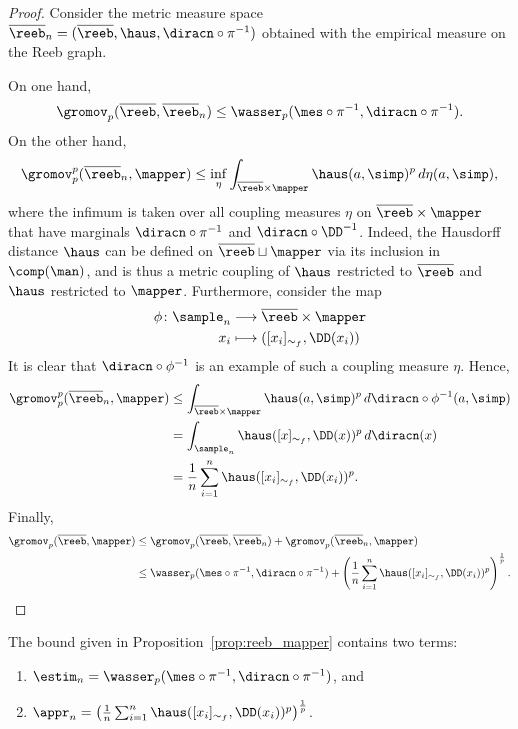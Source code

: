  \begin{proof}
 Consider the metric measure space $\overline{\reeb}_n=(\overline{\reeb},\haus,\diracn\circ\pi^{-1})$ obtained with the empirical measure on the Reeb graph.
 
 On one hand,
$$\gromov_p(\overline{\reeb},\overline{\reeb}_n)\leq\wasser_p(\mes\circ\pi^{-1},\diracn\circ\pi^{-1}).$$
%
On the other hand, 
%
$$\gromov_p^p(\overline{\reeb}_n,\mapper)\leq \inf_{\eta}\int_{\overline{\reeb}\times\mapper}\haus(a,\simp)^p\,d\eta(a,\simp),$$
%
 where the infimum is taken over all coupling measures $\eta$ on $\overline{\reeb}\times\mapper$ that have marginals $\diracn\circ\pi^{-1}$ and $\diracn\circ\DD^{-1}$. Indeed, the Hausdorff distance $\haus$ can be defined on $\overline{\reeb}\sqcup\mapper$ via its inclusion in $\comp(\man)$, and is thus a metric coupling of $\haus$ restricted to $\overline{\reeb}$ and $\haus$ restricted to $\mapper$. Furthermore, consider the map
 \begin{align*}
     \phi\colon\sample_n&\longrightarrow\overline{\reeb}\times\mapper\\
     x_i&\longmapsto([x_i]_{\sim_f},\DD(x_i))
 \end{align*}
 It is clear that $\diracn\circ\phi^{-1}$ is an example of such a coupling measure $\eta$. Hence,
 \begin{align*}
    \gromov_p^p(\overline{\reeb}_n,\mapper)&\leq \int_{\overline{\reeb}\times\mapper}\haus(a,\simp)^p\,d\diracn\circ\phi^{-1}(a,\simp) \\
    &=\int_{\sample_n}\haus([x]_{\sim_f},\DD(x))^p\,d\diracn(x)\\
    &=\frac{1}{n}\sum_{i=1}^n\haus([x_i]_{\sim_f},\DD(x_i))^p.
 \end{align*}
Finally,
  \begin{align*}
    \gromov_p(\overline{\reeb},\mapper)&\leq \gromov_p(\overline{\reeb},\overline{\reeb}_n)+\gromov_p(\overline{\reeb}_n,\mapper)\\
    &\leq\wasser_p(\mes\circ\pi^{-1},\diracn\circ\pi^{-1})+\left(\frac{1}{n}\sum_{i=1}^n\haus([x_i]_{\sim_f},\DD(x_i))^p\right)^{\frac{1}{p}}.
 \end{align*}
 \end{proof}
  The bound given in Proposition~\ref{prop:reeb_mapper} contains two terms:
 \begin{enumerate}
     \item $\estim_n=\wasser_p(\mes\circ\pi^{-1},\diracn\circ\pi^{-1})$, and
     \item $\appr_n=\left(\frac{1}{n}\sum_{i=1}^n\haus([x_i]_{\sim_f},\DD(x_i))^p\right)^{\frac{1}{p}}$.
 \end{enumerate}
 
